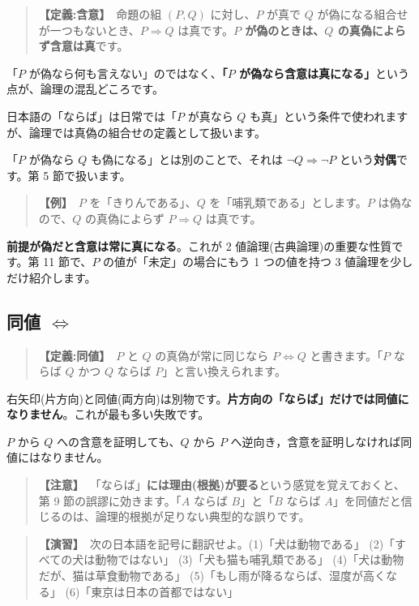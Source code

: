 \documentclass{article}
\begin{document}
\begin{quote}
\textbf{【定義:含意】}\ 命題の組 \((P, Q)\) に対し、\(P\) が真で \(Q\) が偽になる組合せが一つもないとき、\(P \Rightarrow Q\) は真です。\textbf{\(P\) が偽のときは、\(Q\) の真偽によらず含意は真}です。
\end{quote}

「\(P\) が偽なら何も言えない」のではなく、\textbf{「\(P\) が偽なら含意は真になる」}という点が、論理の混乱どころです。

日本語の「ならば」は日常では「\(P\) が真なら \(Q\) も真」という条件で使われますが、論理では真偽の組合せの定義として扱います。

「\(P\) が偽なら \(Q\) も偽になる」とは別のことで、それは \(\neg Q \Rightarrow \neg P\) という\textbf{対偶}です。第 5 節で扱います。

\begin{quote}
\textbf{【例】}\ \(P\) を「きりんである」、\(Q\) を「哺乳類である」とします。\(P\) は偽なので、\(Q\) の真偽によらず \(P \Rightarrow Q\) は真です。
\end{quote}

\textbf{前提が偽だと含意は常に真になる}。これが 2 値論理(古典論理)の重要な性質です。第 11 節で、\(P\) の値が「未定」の場合にもう 1 つの値を持つ 3 値論理を少しだけ紹介します。

\subsection{同値 \(\Leftrightarrow\)}

\begin{quote}
\textbf{【定義:同値】}\ \(P\) と \(Q\) の真偽が常に同じなら \(P \Leftrightarrow Q\) と書きます。「\(P\) ならば \(Q\) かつ \(Q\) ならば \(P\)」と言い換えられます。
\end{quote}

右矢印(片方向)と同値(両方向)は別物です。\textbf{片方向の「ならば」だけでは同値になりません}。これが最も多い失敗です。

\(P\) から \(Q\) への含意を証明しても、\(Q\) から \(P\) へ逆向き，含意を証明しなければ同値にはなりません。

\begin{quote}
\textbf{【注意】}\ 「ならば」\textbf{には理由(根拠)が要る}という感覚を覚えておくと、第 9 節の誤謬に効きます。「\(A\) ならば \(B\)」と「\(B\) ならば \(A\)」を同値だと信じるのは、論理的根拠が足りない典型的な誤りです。
\end{quote}

\begin{quote}
\textbf{【演習】}\ 次の日本語を記号に翻訳せよ。(1)「犬は動物である」 (2)「すべての犬は動物ではない」 (3)「犬も猫も哺乳類である」 (4)「犬は動物だが、猫は草食動物である」 (5)「もし雨が降るならば、湿度が高くなる」 (6)「東京は日本の首都ではない」
\end{quote}
\end{document}
